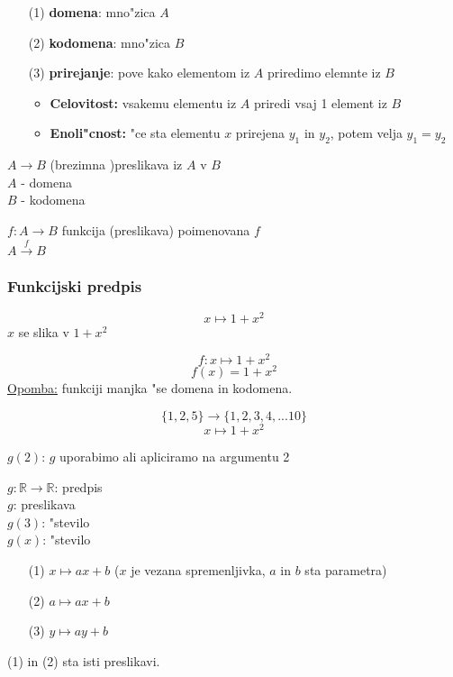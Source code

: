 \begin{itemize}
	\item[(1)] \textbf{domena}: mno"zica \(A\)
	\item[(2)] \textbf{kodomena}: mno"zica \(B\)
	\item[(3)] \textbf{prirejanje}: pove kako elementom iz \(A\) priredimo elemnte iz \(B\)
	\begin{itemize}
		\item \textbf{Celovitost:} vsakemu elementu iz \(A\) priredi vsaj 1 element iz \(B\)
		\item \textbf{Enoli"cnost:} "ce sta elementu \(x\) prirejena \(y_1\) in \(y_2\), potem velja \(y_1 = y_2\)
	\end{itemize}
\end{itemize}

\(A \rightarrow B\) (brezimna )preslikava iz \(A\) v \(B\) \\
\(A\) - domena\\
\(B\) - kodomena

\(f: A \rightarrow B\) funkcija (preslikava) poimenovana \(f\)\\
\(A \stackrel{f}{\rightarrow} B\)

\subsubsection*{Funkcijski predpis}
\[x \mapsto 1 + x^2\]
\(x\) se slika v \(1 + x^2\)

\[f: x \mapsto 1 + x^2\]
\[f(x) = 1 + x^2\]
\underline{Opomba:} funkciji manjka "se domena in kodomena.

\[\{1, 2, 5\} \rightarrow \{1, 2, 3, 4, ... 10\}\]
\[x \mapsto 1+ x^2\]

\(g(2)\): \(g\) uporabimo ali apliciramo na argumentu 2

\(g: \mathbb{R} \rightarrow \mathbb{R}\): predpis\\
\(g\): preslikava\\
\(g(3)\): "stevilo\\
\(g(x)\): "stevilo

\begin{itemize}
	\item[(1)] \(x \mapsto ax + b\) (\(x\) je vezana spremenljivka, \(a\) in \(b\) sta parametra)
	\item[(2)] \(a \mapsto ax + b\)
	\item[(3)] \(y \mapsto ay + b\)
\end{itemize}

(1) in (2) sta isti preslikavi.

